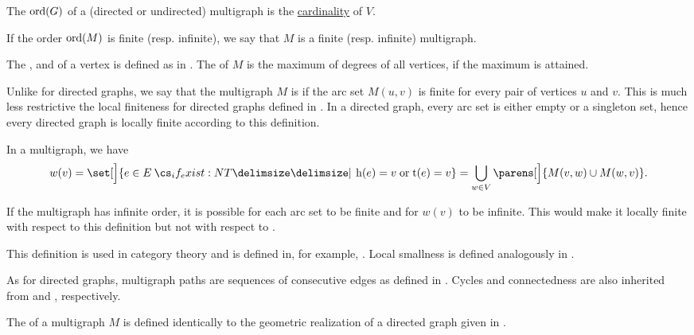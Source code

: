 \begin{definition}
\begin{thmenum}
     The  \( \operatorname{ord}(G) \) of a (directed or undirected) multigraph is the \hyperref[thm:cardinality_existence]{cardinality} of \( V \).

    If the order \( \operatorname{ord}(M) \) is finite (resp. infinite), we say that \( M \) is a finite (resp. infinite) multigraph.

     The ,  and  of a vertex is defined as in . The  of \( M \) is the maximum of degrees of all vertices, if the maximum is attained.

     Unlike for directed graphs, we say that the multigraph \( M \) is  if the arc set \( M(u, v) \) is finite for every pair of vertices \( u \) and \( v \). This is much less restrictive the local finiteness for directed graphs defined in . In a directed graph, every arc set is either empty or a singleton set, hence every directed graph is locally finite according to this definition.

    In a multigraph, we have
    \begin{equation*}
      w(v)
      =
      \set[\Big]{ e \in E \given* \head(e) = v \T{or} \tail(e) = v }
      =
      \bigcup_{w \in V} \parens[\Big]{ M(v, w) \cup M(w, v) }.
    \end{equation*}

    If the multigraph has infinite order, it is possible for each arc set to be finite and for \( w(v) \) to be infinite. This would make it locally finite with respect to this definition but not with respect to .

    This definition is used in category theory and is defined in, for example, \cite{nLab:finite_category}. Local smallness is defined analogously in \cite[75]{Leinster2016Basic}.

     As for directed graphs, multigraph paths are sequences of consecutive edges as defined in . Cycles and connectedness are also inherited from  and , respectively.

     The  of a multigraph \( M \) is defined identically to the geometric realization of a directed graph given in .
  \end{thmenum}
\end{definition}

